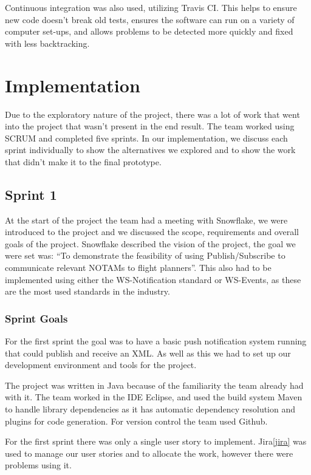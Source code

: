 \documentclass[a4paper, 12pt]{article}
\begin{document}
Continuous integration was also used, utilizing Travis CI. This helps to ensure new code doesn't break old tests, ensures the software can run on a variety of computer set-ups, and allows problems to be detected more quickly and fixed with less backtracking.


\newpage

\section{Implementation}

Due to the exploratory nature of the project, there was a lot of work that went into the project that wasn't present in the end result. The team worked using SCRUM and completed five sprints. In our implementation, we discuss each sprint individually to show the alternatives we explored and to show the work that didn't make it to the final prototype.

\subsection{Sprint 1}

At the start of the project the team had a meeting with Snowflake, we were introduced to the project and we discussed the scope, requirements and overall goals of the project. Snowflake described the vision of the project, the goal we were set was: ``To demonstrate the feasibility of using Publish/Subscribe to communicate relevant NOTAMs to flight planners''. This also had to be implemented using either the WS-Notification standard or WS-Events, as these are the most used standards in the industry.

\subsubsection{Sprint Goals}

For the first sprint the goal was to have a basic push notification system running that could publish and receive an XML. As well as this we had to set up our development environment and tools for the project.

The project was written in Java because of the familiarity the team already had with it. The team worked in the IDE Eclipse, and used the build system Maven to handle library dependencies as it has automatic dependency resolution and plugins for code generation. For version control the team used Github.  

For the first sprint there was only a single user story to implement. Jira\ref{jira} was used to manage our user stories and to allocate the work, however there were problems using it.
\end{document}

